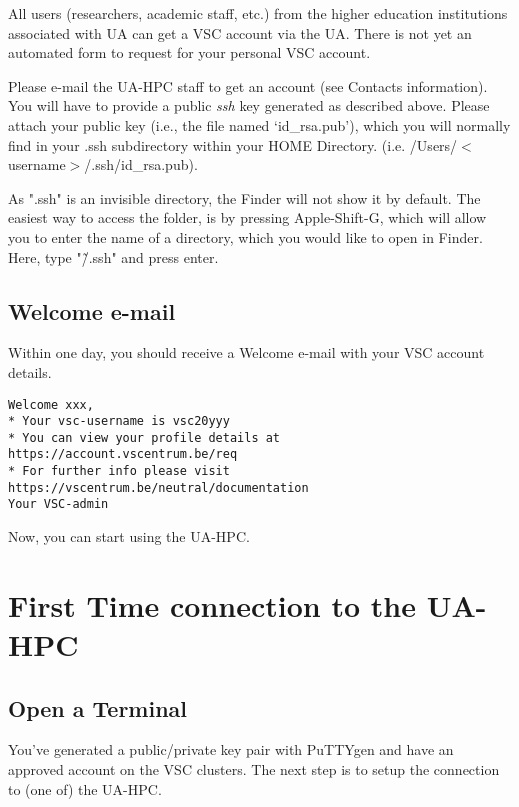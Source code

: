 All users (researchers, academic staff, etc.) from the higher education
institutions associated with UA can get a VSC account via the UA. There is not
yet an automated form to request for your personal VSC account.

Please e-mail the UA-HPC staff to get an account (see Contacts information).
You will have to provide a public \textit{ssh} key generated as described
above. Please attach your public key (i.e., the file named `id\_rsa.pub'),
which you will normally find in your .ssh subdirectory within your HOME
Directory. (i.e. /Users/$<$username$>$/.ssh/id\_rsa.pub).



  \textbf{} As ".ssh" is an invisible directory, the Finder will
  not show it by default. The easiest way to access the folder, is by pressing
  Apple-Shift-G, which will allow you to enter the name of a directory, which
  you would like to open in Finder. Here, type "\~/.ssh" and press enter.

\fi

\subsection{Welcome e-mail}
\label{subsec:welcome-email}

Within one day, you should receive a Welcome e-mail with your VSC account details.

\begin{verbatim}
Welcome xxx,
* Your vsc-username is vsc20yyy
* You can view your profile details at https://account.vscentrum.be/req
* For further info please visit https://vscentrum.be/neutral/documentation
Your VSC-admin
\end{verbatim}

Now, you can start using the UA-HPC.

\section{First Time connection to the UA-HPC}
\label{sec:first-time-connection-to-the-hpc}


  \subsection{Open a Terminal}
  \label{subsec:windows-open-a-terminal}

  You've generated a public/private key pair with PuTTYgen and have an approved
  account on the VSC clusters.  The next step is to setup the connection to (one
  of) the UA-HPC.

